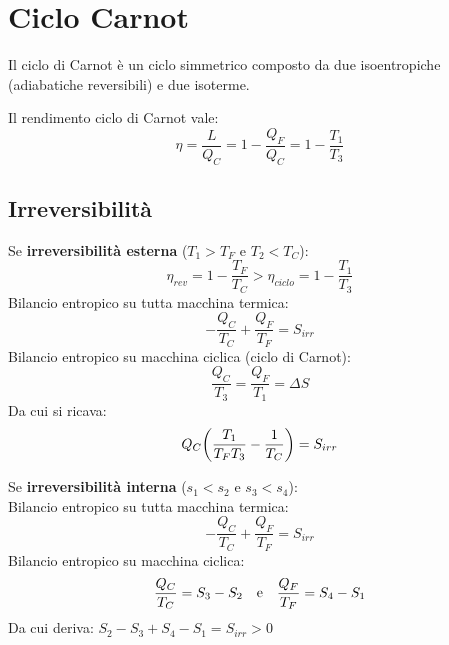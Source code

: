\section{Ciclo Carnot}
Il ciclo di Carnot è un ciclo simmetrico composto da due isoentropiche (adiabatiche reversibili) e due isoterme.

Il rendimento ciclo di Carnot vale:
\[ \eta = \frac{L}{Q_C} = 1 - \frac{Q_F}{Q_C} = 1 - \frac{T_1}{T_3} \]

\begin{minipage}{.5\linewidth}
\end{minipage}%
\begin{minipage}{.5\linewidth}
\end{minipage}

\subsection{Irreversibilità}
Se \textbf{irreversibilità esterna} ($T_1 > T_F$ e $T_2 < T_C$):
\[ \eta_{rev} = 1 - \frac{T_F}{T_C} > \eta_{ciclo} = 1 - \frac{T_1}{T_3} \]
Bilancio entropico su tutta macchina termica:
\[ -\frac{Q_C}{T_C} + \frac{Q_F}{T_F} = S_{irr} \]
Bilancio entropico su macchina ciclica (ciclo di Carnot):
\[ \frac{Q_C}{T_3} = \frac{Q_F}{T_1} = \Delta S \]
Da cui si ricava:
\[ Q_C \qty(\frac{T_1}{T_F T_3} - \frac{1}{T_C}) = S_{irr} \]

Se \textbf{irreversibilità interna} ($s_1 < s_2$ e $s_3 < s_4$):\\
Bilancio entropico su tutta macchina termica:
\[ -\frac{Q_C}{T_C} + \frac{Q_F}{T_F} = S_{irr} \]
Bilancio entropico su macchina ciclica:
\[ \frac{Q_C}{T_C} = S_3 - S_2 \qq{e} \frac{Q_F}{T_F} = S_4 - S_1 \]
Da cui deriva: $S_2 - S_3 + S_4 - S_1 = S_{irr} > 0$
